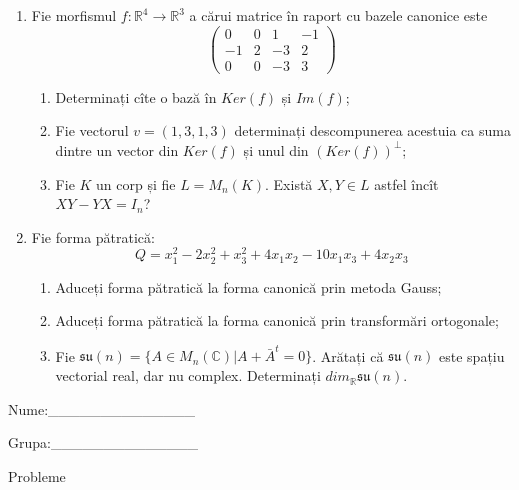 \documentclass{article}
\begin{document}
\begin{enumerate}
 \item Fie morfismul $f:\mathbb{R}^4 \to \mathbb{R}^3$ a cărui matrice în raport cu bazele canonice este
$$\begin{pmatrix}
0&0&1&-1\\
-1&2&-3&2\\
0&0&-3&3
\end{pmatrix}$$

\begin{enumerate}
\item Determinați cîte o bază în $Ker(f)$ și $Im(f)$;
\item Fie vectorul $v=(1,3,1,3)$ determinați descompunerea acestuia ca suma dintre un vector din $Ker(f)$ și unul din $(Ker(f))^\perp$;
\item Fie $K$ un corp și fie $L=M_n(K)$. Există $X,Y \in L$ astfel încît $XY-YX=I_n$?  
\end{enumerate}
\item Fie forma pătratică:
$$Q= x_1^2-2x_2^2+x_3^2+4x_1x_2-10x_1x_3+4x_2x_3$$

\begin{enumerate}
\item Aduceți forma pătratică la forma canonică prin metoda Gauss;
\item Aduceți forma pătratică la forma canonică prin transformări ortogonale;
\item Fie $\mathfrak{su}(n)=\{ A \in M_n(\mathbb{C}) | A+\bar{A}^t=0\}$. Arătați că $\mathfrak{su}(n)$ este spațiu vectorial real, dar nu complex.
Determinați $dim_{\mathbb{R}}\mathfrak{su}(n)$.
\end{enumerate}
\end{enumerate}
\newpage
\begin{flushright}
Nume:\_\_\_\_\_\_\_\_\_\_\_\_\_\_
 
 
Grupa:\_\_\_\_\_\_\_\_\_\_\_\_\_\_
\end{flushright}
\begin{center}
\vspace{2cm}
{\Large Probleme}
\vspace{2cm}
\end{center}
\end{document}
